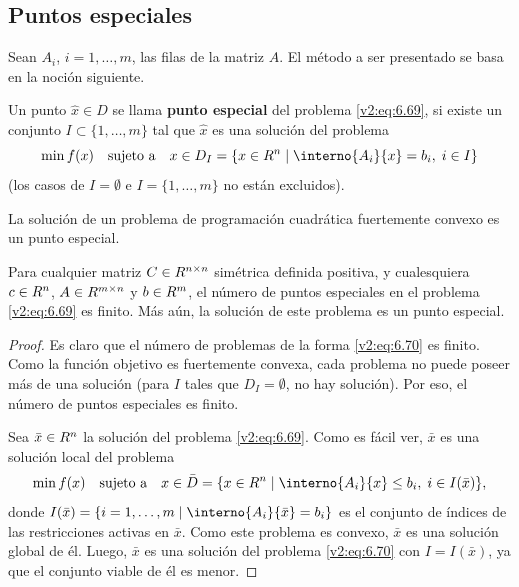 \subsection{Puntos especiales}
\label{v2:sec:6.2.1}

Sean $A_i$, $i = 1, \dots, m$, las filas de la matriz $A$. El método a ser presentado se basa en la noción siguiente.

\begin{definition}\label{v2:def:6.2.1}
    Un punto $\hat{x} \in D$ se llama \textbf{punto especial} del problema \eqref{v2:eq:6.69}, si existe un conjunto $I \subset \{1, \dots, m\}$ tal que $\hat{x}$ es una solución del problema
    \begin{equation}
        \min f(x) \quad \text{sujeto a} \quad x \in D_I = \{ x \in \Rn \mid \interno{A_i}{x} = b_i, \; i \in I \}
        \label{v2:eq:6.70}
    \end{equation}
    (los casos de $I = \emptyset$ e $I = \{1, \dots, m\}$ no están excluidos).
\end{definition}

La solución de un problema de programación cuadrática fuertemente convexo es un punto especial.

\begin{theorem}\label{v2:thm:6.2.1}
    Para cualquier matriz $C \in R^{n \times n}$ simétrica definida positiva, y cualesquiera $c \in R^n$, $A \in R^{m \times n}$ y $b \in R^m$, el número de puntos especiales en el problema \eqref{v2:eq:6.69} es finito. Más aún, la solución de este problema es un punto especial.
\end{theorem}

\begin{proof}
    Es claro que el número de problemas de la forma \eqref{v2:eq:6.70} es finito. Como la función objetivo es fuertemente convexa, cada problema no puede poseer más de una solución (para $I$ tales que $D_I = \emptyset$, no hay solución). Por eso, el número de puntos especiales es finito.
    
    Sea $\bar{x} \in R^n$ la solución del problema \eqref{v2:eq:6.69}. Como es fácil ver, $\bar{x}$ es una solución local del problema
    \[
        \min f(x) \quad \text{sujeto a} \quad x \in \bar{D} = \{ x \in \Rn \mid \interno{A_i}{x} \le b_i, \; i \in I(\bar{x}) \},
    \]
    donde $I(\bar{x}) = \{ i = 1, \dots, m \mid \interno{A_i}{\bar{x}} = b_i \}$ es el conjunto de índices de las restricciones activas en $\bar{x}$. Como este problema es convexo, $\bar{x}$ es una solución global de él. Luego, $\bar{x}$ es una solución del problema \eqref{v2:eq:6.70} con $I = I(\bar{x})$, ya que el conjunto viable de él es menor.
\end{proof}

